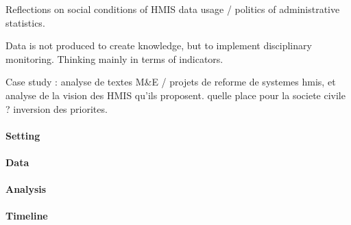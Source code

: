 \documentclass[a4paper,11pt,final,twoside]{article}
\begin{document}
Reflections on social conditions of HMIS data usage  / politics of administrative statistics.

Data is not produced to create knowledge, but to implement disciplinary monitoring. Thinking mainly in terms of indicators.

Case study : analyse de textes M\&E / projets de reforme de systemes hmis, et analyse de la vision des HMIS qu'ils proposent. quelle place pour la societe civile ? inversion des priorites.

\paragraph{Setting}

\paragraph{Data}

\paragraph{Analysis}

\paragraph{Timeline}


\newpage

\end{document}
